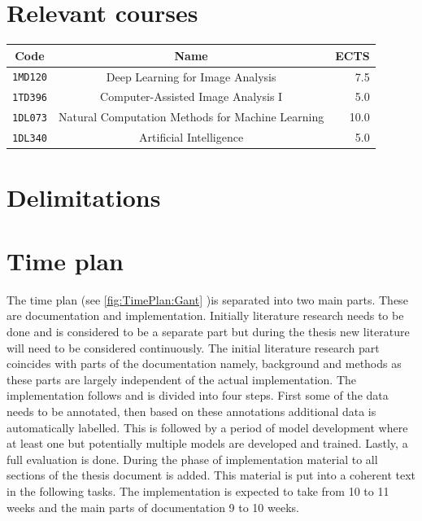 \documentclass[a4paper,11pt]{article}
\begin{document}
\section{Relevant courses}

\begin{table}[H]
    \centering
    \begin{tabular}{|c|c|r|} 
        \hline
        Code & Name & ECTS \\
        \hline
        \texttt{1MD120} & Deep Learning for Image Analysis & 7.5 \\
        \texttt{1TD396} & Computer-Assisted Image Analysis I & 5.0\\
        \texttt{1DL073} & Natural Computation Methods for Machine Learning & 10.0 \\
        \texttt{1DL340} & Artificial Intelligence & 5.0\\
        \hline
    \end{tabular}
\end{table}

\section{Delimitations}


\section{Time plan}

The time plan (see \autoref{fig:TimePlan:Gant} )is separated into two main parts. These are documentation and implementation. Initially literature research needs to be done and is considered to be a separate part but during the thesis new literature will need to be considered continuously. The initial literature research part coincides with parts of the documentation namely, background and methods as these parts are largely independent of the actual implementation. The implementation follows and is divided into four steps. First some of the data needs to be annotated, then based on these annotations additional data is automatically labelled. This is followed by a period of model development where at least one but potentially multiple models are developed and trained. Lastly, a full evaluation is done. During the phase of implementation material to all sections of the thesis document is added. This material is put into a coherent text in the following tasks. The implementation is expected to take from 10 to 11 weeks and the main parts of documentation 9 to 10 weeks.
\end{document}
